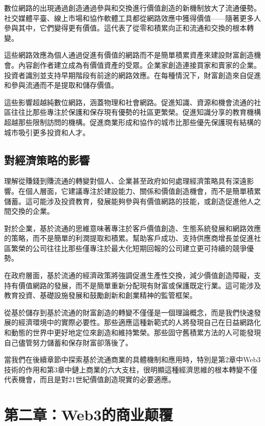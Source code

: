 \documentclass[
  Letterpaper,
]{scrbook}
\begin{document}
數位網路的出現通過創造通過參與和交換進行價值創造的新機制放大了流通優勢。社交媒體平臺、線上市場和協作軟體工具都從網路效應中獲得價值------隨著更多人參與其中，它們變得更有價值。這代表了從零和積累向正和流通和交換的根本轉變。

這些網路效應為個人通過促進有價值的網路而不是簡單積累資產來建設財富創造機會。內容創作者建立成為有價值資產的受眾。企業家創造連接買家和賣家的企業。投資者識別並支持早期階段有前途的網路效應。在每種情況下，財富創造來自促進和參與流通而不是提取和儲存價值。

這些影響超越純數位網路，涵蓋物理和社會網路。促進知識、資源和機會流通的社區往往比那些專注於保護和保存現有優勢的社區更繁榮。促進知識分享的教育機構超越那些限制訪問的機構。促進商業形成和協作的城市比那些優先保護現有結構的城市吸引更多投資和人才。

\section{對經濟策略的影響}\label{ux5c0dux7d93ux6fdfux7b56ux7565ux7684ux5f71ux97ff}

理解從賺錢到賺流通的轉變對個人、企業甚至政府如何處理經濟策略具有深遠影響。在個人層面，它建議專注於建設能力、關係和價值創造機會，而不是簡單積累儲蓄。這可能涉及投資教育，發展能夠參與有價值網路的技能，或創造促進他人之間交換的企業。

對於企業，基於流通的思維意味著專注於客戶價值創造、生態系統發展和網路效應的策略，而不是簡單的利潤提取和積累。幫助客戶成功、支持供應商增長並促進社區繁榮的公司往往比那些僅專注於最大化短期回報的公司建立更可持續的競爭優勢。

在政府層面，基於流通的經濟政策將強調促進生產性交換，減少價值創造障礙，支持有價值網路的發展，而不是簡單重新分配現有財富或保護既定行業。這可能涉及教育投資、基礎設施發展和鼓勵創新和創業精神的監管框架。

從基於儲存到基於流通的財富創造的轉變不僅僅是一個理論概念，而是我們快速發展的經濟環境中的實際必要性。那些適應這種新範式的人將發現自己在日益網路化和動態的世界中更好地定位來創造和維持繁榮。那些固守舊積累方法的人可能發現自己儘管努力儲蓄和保存財富卻落後了。

當我們在後續章節中探索基於流通商業的具體機制和應用時，特別是第2章中Web3技術的作用和第3章中鏈上商業的六大支柱，很明顯這種經濟思維的根本轉變不僅代表機會，而且是對21世紀價值創造現實的必要適應。

\chapter{第二章：Web3的商业颠覆}\label{sec-web3-disruption}
\end{document}
